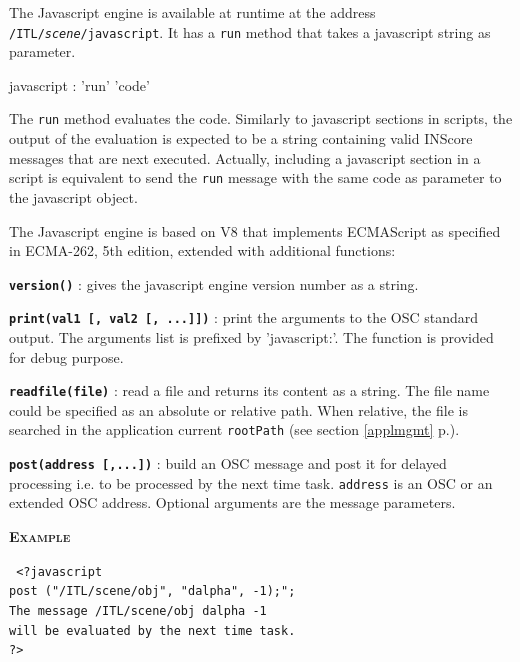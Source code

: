 \documentclass[a4paper,twoside]{report}
\newcommand{\fullref}[1]	{\ref{#1} p.\pageref{#1}}
\newcommand{\OSC}[1]		{\texttt{#1}}
\newcommand{\example}		{\textbf{\hspace{-1.5cm}\textbf{\textsc{Example }}}}
\newcommand{\note}	[1]		{\vspace{2mm}\textbf{\hspace{-1.03cm}\textbf{\textsc{Note #1}}}}
\let\olditemize\itemize
\let\oldenditemize\enditemize
\renewenvironment{itemize} 	{\olditemize \setlength{\itemsep}{1mm}}{\oldenditemize}
\newcommand{\sample}	[1]			{\vspace{-2mm}\begin{center}\colorbox{mygrey}{
								\begin{minipage}[t]{0.9\columnwidth} 
								{\small \texttt{#1}}
								\end{minipage}}\end{center}}
\begin{document}
The Javascript engine is available at runtime at the address \OSC{/ITL/\textit{scene}/javascript}. It has a \OSC{run} method that takes a javascript string as parameter.

\begin{rail} 
javascript :  'run' 'code'
\end{rail}

The \OSC{run} method evaluates the code. Similarly to javascript sections in scripts, the output of the evaluation is expected to be a string containing valid INScore messages that are next executed. 
Actually, including a javascript section in a script is equivalent to send the \OSC{run} message with the same code as parameter to the javascript object.

The Javascript engine is based on V8 that implements ECMAScript as specified in ECMA-262, 5th edition, extended with additional functions:
\begin{itemize}
\item \textbf{\OSC{version()}} : gives the javascript engine version number as a string.
\item \textbf{\OSC{print(val1 [, val2 [, ...]])}} : print the arguments to the OSC standard output. The arguments list is prefixed by 'javascript:'. The function is provided for debug purpose.
\item \textbf{\OSC{readfile(file)}} : read a file and returns its content as a string. The file name could be specified as an absolute or relative path. When relative, the file is searched in the application current \OSC{rootPath} (see section \fullref{applmgmt}).
\item \textbf{\OSC{post(address [,...])}} : build an OSC message and post it for delayed processing i.e. to be processed by the next time task. \OSC{address} is an OSC or an extended OSC address. Optional arguments are the message parameters.
\end{itemize}


\example
\sample{
<?javascript \\
\hspace*{3mm} post ("/ITL/scene/obj", "dalpha", -1);";\\ 
\hspace*{3mm} The message /ITL/scene/obj dalpha -1 \\
\hspace*{3mm} will be evaluated by the next time task. \\
?>
}


%
\end{document}
